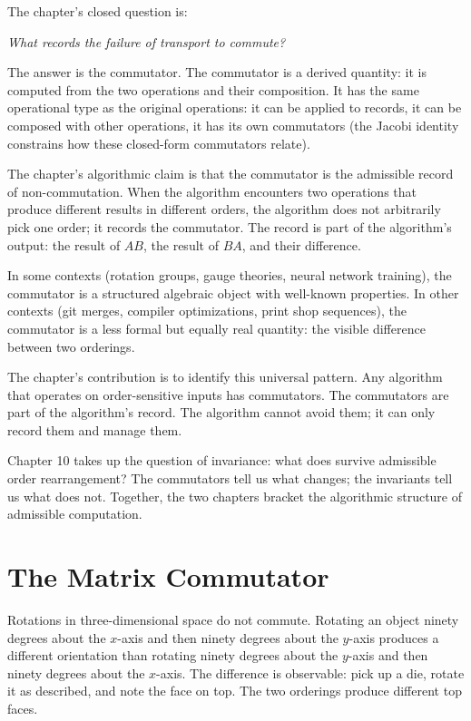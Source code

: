 \begin{chapteressay}
The chapter's closed question is:

\begin{center}
\emph{What records the failure of transport to commute?}
\end{center}

The answer is the commutator. The commutator is a derived
quantity: it is computed from the two operations and their
composition. It has the same operational type as the original
operations: it can be applied to records, it can be composed with
other operations, it has its own commutators (the Jacobi identity
constrains how these closed-form commutators relate).

The chapter's algorithmic claim is that the commutator is the
admissible record of non-commutation. When the algorithm encounters
two operations that produce different results in different orders,
the algorithm does not arbitrarily pick one order; it records the
commutator. The record is part of the algorithm's output: the
result of $AB$, the result of $BA$, and their difference.

In some contexts (rotation groups, gauge theories, neural network
training), the commutator is a structured algebraic object with
well-known properties. In other contexts (git merges, compiler
optimizations, print shop sequences), the commutator is a less
formal but equally real quantity: the visible difference between
two orderings.

The chapter's contribution is to identify this universal pattern.
Any algorithm that operates on order-sensitive inputs has
commutators. The commutators are part of the algorithm's record.
The algorithm cannot avoid them; it can only record them and
manage them.

Chapter 10 takes up the question of invariance: what does survive
admissible order rearrangement? The commutators tell us what
changes; the invariants tell us what does not. Together, the two
chapters bracket the algorithmic structure of admissible
computation.

\end{chapteressay}

\section{The Matrix Commutator}
\label{se:the-matrix-commutator}

Rotations in three-dimensional space do not commute. Rotating an object
ninety degrees about the $x$-axis and then ninety degrees about the
$y$-axis produces a different orientation than rotating ninety degrees
about the $y$-axis and then ninety degrees about the $x$-axis. The
difference is observable: pick up a die, rotate it as described, and
note the face on top. The two orderings produce different top faces.

